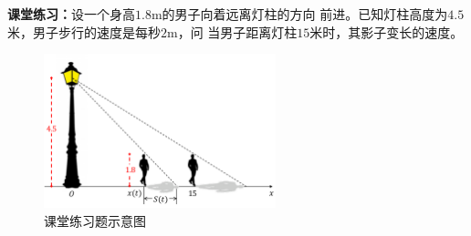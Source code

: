 {\bf 课堂练习：}设一个身高$1.8$m的男子向着远离灯柱的方向
前进。已知灯柱高度为$4.5$米，男子步行的速度是每秒$2$m，问
当男子距离灯柱$15$米时，其影子变长的速度。

\begin{figure}[h]
	\centering
	\includegraphics[width=0.6\textwidth]
	{./Images/Ch02/manShadow.pdf}
	\caption{课堂练习题示意图}
	\label{fig:manShadow}
\end{figure}

